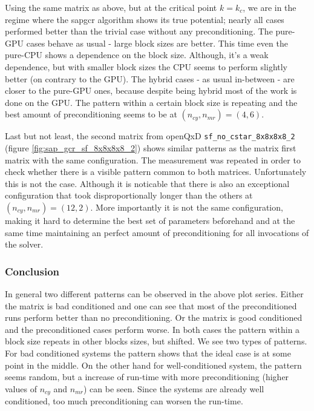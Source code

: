 \documentclass{article}
\theoremstyle{plain} %
\theoremstyle{convention} %
\theoremstyle{remark} %
\def\code#1{\texttt{#1}}
\numberwithin{equation}{section}
\begin{document}
Using the same matrix as above, but at the critical point $k=k_c$, we are in the regime where the \acrshort{sapgcr} algorithm shows its true potential; nearly all cases performed better than the trivial case without any preconditioning. The pure-GPU cases behave as usual - large block sizes are better. This time even the pure-CPU shows a dependence on the block size. Although, it's a weak dependence, but with smaller block sizes the CPU seems to perform slightly better (on contrary to the GPU). The hybrid cases - as usual in-between - are closer to the pure-GPU ones, because despite being hybrid most of the work is done on the GPU. The pattern within a certain block size is repeating and the best amount of preconditioning seems to be at $(n_{cy}, n_{mr}) = (4,6)$.

Last but not least, the second matrix from openQxD \code{sf\_no\_cstar\_8x8x8x8\_2} (figure \ref{fig:sap_gcr_sf_8x8x8x8_2}) shows similar patterns as the matrix first matrix with the same configuration. The measurement was repeated in order to check whether there is a visible pattern common to both matrices. Unfortunately this is not the case. Although it is noticable that there is also an exceptional configuration that took disproportionally longer than the others at $(n_{cy}, n_{mr}) = (12,2)$. More importantly it is not the same configuration, making it hard to determine the best set of parameters beforehand and at the same time maintaining an perfect amount of preconditioning for all invocations of the solver.


\subsubsection{Conclusion}

In general two different patterns can be observed in the above plot series. Either the matrix is bad conditioned and one can see that most of the preconditioned runs perform better than no preconditioning. Or the matrix is good conditioned and the preconditioned cases perform worse. In both cases the pattern within a block size repeats in other blocks sizes, but shifted. We see two types of patterns. For bad conditioned systems the pattern shows that the ideal case is at some point in the middle. On the other hand for well-conditioned system, the pattern seems random, but a increase of run-time with more preconditioning (higher values of $n_{cy}$ and $n_{mr}$) can be seen. Since the systems are already well conditioned, too much preconditioning can worsen the run-time.
\end{document}

